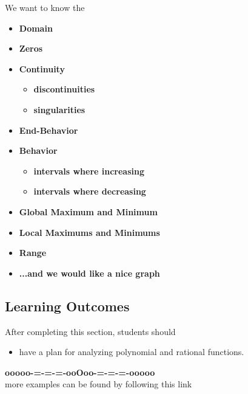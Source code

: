 \documentclass{ximera}
\begin{document}
We want to know the 
\begin{itemize}
     \item \textbf{\textcolor{red!80!black}{Domain}} 
     \item \textbf{\textcolor{red!80!black}{Zeros}} 
     \item \textbf{\textcolor{red!80!black}{Continuity}} 
\begin{itemize}
     \item \textbf{\textcolor{purple!85!blue}{discontinuities}} 
     \item \textbf{\textcolor{purple!85!blue}{singularities}} 
\end{itemize}
     \item \textbf{\textcolor{red!80!black}{End-Behavior}} 
     \item \textbf{\textcolor{red!80!black}{Behavior}} 
\begin{itemize}
     \item \textbf{\textcolor{purple!85!blue}{intervals where increasing}} 
     \item \textbf{\textcolor{purple!85!blue}{intervals where decreasing}} 
\end{itemize}
     \item \textbf{\textcolor{red!80!black}{Global Maximum and Minimum}} 
     \item \textbf{\textcolor{red!80!black}{Local Maximums and Minimums}} 
     \item \textbf{\textcolor{red!80!black}{Range}} 
     \item \textbf{\textcolor{blue!55!black}{...and we would like a nice graph}} 
\end{itemize}










\subsection*{Learning Outcomes}

\begin{sectionOutcomes}
After completing this section, students should 

\begin{itemize}
\item have a plan for analyzing polynomial and rational functions.
\end{itemize}
\end{sectionOutcomes}





\begin{center}
\textbf{\textcolor{green!50!black}{ooooo-=-=-=-ooOoo-=-=-=-ooooo}} \\

more examples can be found by following this link\\ 

\end{center}
\end{document}
